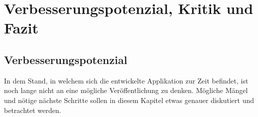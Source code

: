 \documentclass[a4paper,11pt]{report}
\begin{document}
		
		\chapter{Verbesserungspotenzial, Kritik und Fazit}
		
		\section{Verbesserungspotenzial}
		In dem Stand, in welchem sich die entwickelte Applikation zur Zeit befindet, ist noch lange nicht an eine mögliche Veröffentlichung zu denken. Mögliche Mängel und nötige nächste Schritte sollen in diesem Kapitel etwas genauer diskutiert und betrachtet werden.
		
\end{document}
